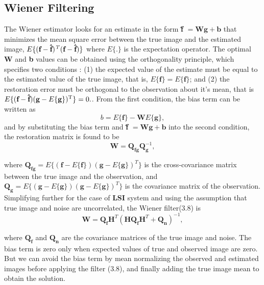 \documentclass[a4paper]{book}
\begin{document}
\subsection{Wiener Filtering}
The Wiener estimator looks for an estimate in the form \textbf{\^{f}} $ = \textbf{Wg} + \textbf{b} $ that minimizes the mean square error between the true image and the estimated image, $E\{(\textbf{f}-\textbf{\^{f}})\textsuperscript{\textit{T}}(\textbf{f}-\textbf{\^{f}})\}$ where $ E\{.\} $ is the expectation operator. The optimal \textbf{W} and \textbf{b} values can be obtained using the orthogonality principle\cite{Pap91opt}, which specifies two conditions : (1) the expected value of the estimate must be equal to the estimated value of the true image, that is, $ E\{\textbf{\^{f}}\} = E\{\textbf{f}\} $; and (2) the restoration error must be orthogonal to the observation about it's mean, that is $ E\{(\textbf{f}-\textbf{\^{f}})(\textbf{g}-E\{\textbf{g}\})\textsuperscript{T}\} = 0.$. From the first condition, the bias term can be written as 
\begin{equation}
\label{eq3.7}
b = E\{\textbf{f}\} - \textbf{W}E\{\textbf{g}\},
\end{equation}
and by substituting the bias term and \textbf{\^{f}} $ = \textbf{Wg} + \textbf{b} $ into the second condition, the restoration matrix is found to be 
\begin{equation}
\label{eq3.8}
\textbf{W} = \textbf{Q}_{\textbf{fg}}\textbf{Q}_{\textbf{g}}^{-1},
\end{equation}

where $ \textbf{Q}_{\textbf{fg}} = E\{(\textbf{f} - E\{\textbf{f}\})(\textbf{g}-E\{\textbf{g}\})^{T} \} $ is the cross-covariance matrix between the true image and the observation, and $ \textbf{Q}_{\textbf{g}} = E\{(\textbf{g} - E\{\textbf{g}\})(\textbf{g}-E\{\textbf{g}\})^{T} \} $ is the covariance matrix of the observation. Simplifying further for the case of \textbf{LSI} system and using the assumption that true image and noise are uncorrelated, the Wiener filter(3.8) is 
\begin{equation}
\label{eq3.9}
\textbf{W} = \textbf{Q}_{\textbf{f}}\textbf{H}^{T}(\textbf{H}\textbf{Q}_{\textbf{f}}\textbf{H}^{T} + \textbf{Q}_{\textbf{n}})^{-1},
\end{equation}

where $ \textbf{Q}_{\textbf{f}} $ and $ \textbf{Q}_{\textbf{n}} $ are the covariance matrices of the true image and noise. The bias term is zero only when expected values of true and observed image are zero. But we can avoid the bias term by mean normalizing the observed and estimated images before applying the filter (3.8), and finally adding the true image mean to obtain the solution.
\end{document}
